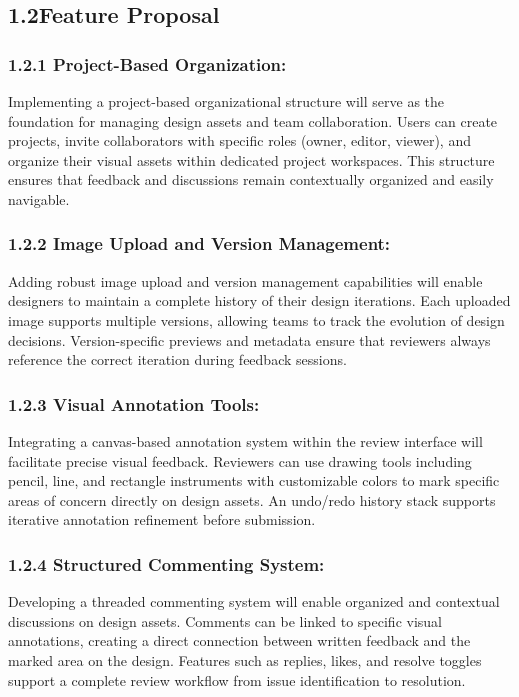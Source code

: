 \documentclass[12pt,a4paper]{article}
\begin{document}
\subsection{1.2\quad Feature Proposal}

\subsubsection{1.2.1 Project-Based Organization:}

Implementing a project-based organizational structure will serve as the foundation for managing design assets and team collaboration. Users can create projects, invite collaborators with specific roles (owner, editor, viewer), and organize their visual assets within dedicated project workspaces. This structure ensures that feedback and discussions remain contextually organized and easily navigable.

\subsubsection{1.2.2 Image Upload and Version Management:}

Adding robust image upload and version management capabilities will enable designers to maintain a complete history of their design iterations. Each uploaded image supports multiple versions, allowing teams to track the evolution of design decisions. Version-specific previews and metadata ensure that reviewers always reference the correct iteration during feedback sessions.

\subsubsection{1.2.3 Visual Annotation Tools:}

Integrating a canvas-based annotation system within the review interface will facilitate precise visual feedback. Reviewers can use drawing tools including pencil, line, and rectangle instruments with customizable colors to mark specific areas of concern directly on design assets. An undo/redo history stack supports iterative annotation refinement before submission.

\subsubsection{1.2.4 Structured Commenting System:}

Developing a threaded commenting system will enable organized and contextual discussions on design assets. Comments can be linked to specific visual annotations, creating a direct connection between written feedback and the marked area on the design. Features such as replies, likes, and resolve toggles support a complete review workflow from issue identification to resolution.
\end{document}
